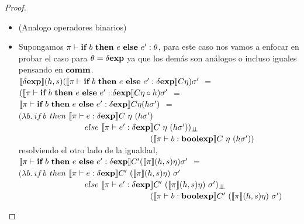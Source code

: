\begin{proof}
\begin{itemize}
\begin{itemize}
hasta ac\'a ha sido simplemente reescribir usando definiciones, de esta manera llegamos
a poder aplicar la hip\'otesis inductiva,\\

$(\lambda b. \ \iotabot \neg b)_{\dbot}
	(\semBrcks{\boolexp}(h,s)(\semBrcks{\pi \vdash e :\boolexp}C\eta)\sigma')$ $=$\\
$(\lambda b. \ \iotabot \neg b)_{\dbot}
	(\semBrcks{\pi \vdash e : \boolexp}C(\semBrcks{\pi}(h,s)\eta)\sigma')$ $=$\\
$\semBrcks{\pi \vdash \neg e : \boolexp}C(\semBrcks{\pi}(h,s)\eta)\sigma'$

\item (Analogo operadores binarios)

\item Supongamos $\pi \vdash \textbf{if} \ b \ \textbf{then} \ e \ \textbf{else} \ e' : \theta$, para este caso
nos vamos a enfocar en probar el caso para $\theta = \delta \textbf{exp}$ ya que los dem\'as
son an\'alogos o incluso iguales pensando en $\textbf{comm}$.\\

$\llbracket \delta \textbf{exp} \rrbracket(h,s)
	(\llbracket \pi \vdash \textbf{if} \ b \ \textbf{then} \ e \ \textbf{else} \ e' : \delta \textbf{exp} \rrbracket C\eta)\sigma'$ $=$\\
$(\llbracket \pi \vdash \textbf{if} \ b \ \textbf{then} \ e \ \textbf{else} \ e' : \delta \textbf{exp} \rrbracket C\eta \circ h)\sigma'$ $=$\\
$\llbracket \pi \vdash \textbf{if} \ b \ \textbf{then} \ e \ \textbf{else} \ e' : \delta \textbf{exp} \rrbracket C\eta (h\sigma')$ $=$\\
$(\lambda b . \ if \ b $ $then \ \llbracket  \pi \vdash e : \delta \textbf{exp} \rrbracket C \ \eta \ (h\sigma')$\\
\indent \ \ \ \ \ \ \ \ \ \ \ \ \ \ \ \ 
$else \ \llbracket  \pi \vdash e' : \delta \textbf{exp} \rrbracket C \ \eta \ (h\sigma'))_{\bot \!\!\! \bot}$ \\
\indent \ \ \ \ \ \ \ \ \ \ \ \ \ \ \ \ \ \ \ \ \ \ \ \ \ \ \ \ \ \ \ \
$(\llbracket  \pi \vdash b : \textbf{boolexp} \rrbracket C \ \eta \ (h\sigma'))$\\

resolviendo el otro lado de la igualdad,\\

$\llbracket \pi \vdash \textbf{if} \ b \ \textbf{then} \ e \ \textbf{else} \ e' : \delta \textbf{exp} \rrbracket C'
							(\llbracket \pi \rrbracket(h,s)\eta)\sigma'$ $=$\\
$(\lambda b . \ if \ b $ $then \ \semBrcks{ \pi \vdash e : \deltaexp}C' \ 
						(\semBrcks{\pi}(h,s)\eta) \ \sigma'$\\
\indent \ \ \ \ \ \ \ \ \ \ \ \ \ \ \ \ 
$else \ \semBrcks{ \pi \vdash e' : \deltaexp}C' \ 
						(\semBrcks{\pi}(h,s)\eta) \ \sigma')_{\dbot}$ \\
\indent \ \ \ \ \ \ \ \ \ \ \ \ \ \ \ \ \ \ \ \ \ \ \ \ \ \ \ \ \ \ \ \
$(\semBrcks{ \pi \vdash b : \boolexp}C' \ (\semBrcks{\pi}(h,s)\eta) \ \sigma')$\\


\end{itemize}
\end{itemize}
\end{proof}
